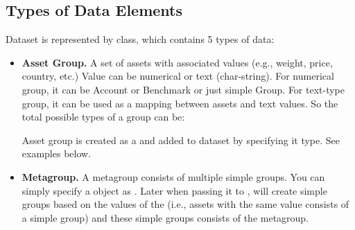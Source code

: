 \subsection{Types of Data Elements\label{sec:DataType}}
Dataset is represented by  class, which contains 5 types of data:
\begin{itemize}
    \item \textbf{Asset Group.} 
          A set of assets with associated values (e.g., weight, price, country, etc.)
          Value can be numerical or text (char-string). 
          For numerical group, it can be Account or Benchmark or just simple Group.
          For text-type group, it can be used as a mapping between assets and text values.
          So the total possible types of a group can be:
          Asset group is created as a \myfints{} and added to dataset by specifying it type. See examples below.
    \item \textbf{Metagroup.}
          A metagroup consists of multiple simple groups. 
          You can simply specify a \myfints{} object as . 
          Later when \matlab{} passing it to \axioma{}, \matlab{} will create simple groups based on the values of the \myfints{}
          (i.e., assets with the same value consists of a simple group) and these simple groups consists of the metagroup. 

\end{itemize}
